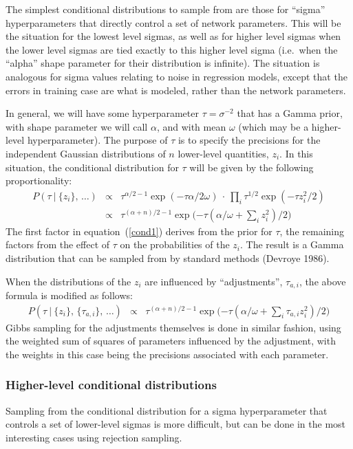 \documentclass{report}[11pt]
\def\beq{\begin{eqnarray}}
\def\eeq{\end{eqnarray}}
\begin{document}
The simplest conditional distributions to sample from are those for 
``sigma'' hyperparameters that directly control a set of network
parameters.  This will be the situation for the lowest level
sigmas, as well as for higher level sigmas when the lower level sigmas
are tied exactly to this higher level sigma (i.e.\ when the ``alpha''
shape parameter for their distribution is infinite).  The situation is
analogous for sigma values relating to noise in regression models,
except that the errors in training case are what is modeled, rather
than the network parameters.

In general, we will have some hyperparameter $\tau=\sigma^{-2}$ that
has a Gamma prior, with shape parameter we will call $\alpha$, and
with mean $\omega$ (which may be a higher-level hyperparameter).  The
purpose of $\tau$ is to specify the precisions for the independent
Gaussian distributions of $n$ lower-level quantities, $z_i$.  In this
situation, the conditional distribution for $\tau$ will be given by the
following proportionality:\beq
  P(\tau\ |\ \{z_i\},\,\ldots) & \propto &
    \tau^{\alpha/2-1} \exp(-\tau\alpha/2\omega) \ \cdot\ 
    \prod_i \tau^{1/2} \exp(-\tau z_i^2/2) \label{cond1}\\[3pt]
  & \propto &
    \tau^{(\alpha+n)/2-1} 
    \exp\big({\textstyle-\tau(\alpha/\omega+\sum\limits_i z_i^2)/2}\big)
\eeq%
The first factor in equation~(\ref{cond1}) derives from the prior for $\tau$, 
the remaining factors from the effect of $\tau$ on the probabilities of the 
$z_i$.  The result is a Gamma distribution that can be sampled from by 
standard methods (Devroye 1986).

When the distributions of the $z_i$ are influenced by ``adjustments'',
$\tau_{a,i}$, the above formula is modified as follows:\beq
  P(\tau\ |\ \{z_i\},\,\{\tau_{a,i}\},\,\ldots) 
  & \propto &
    \tau^{(\alpha+n)/2-1} 
    \exp\big({\textstyle-\tau(\alpha/\omega+\sum\limits_i \tau_{a,i}z_i^2)/2}
    \big)
\eeq%
Gibbs sampling for the adjustments themselves is done in similar fashion,
using the weighted sum of squares of parameters influenced by the adjustment,
with the weights in this case being the precisions associated with each 
parameter.


\subsubsection*{Higher-level conditional distributions}

Sampling from the conditional distribution for a sigma hyperparameter
that controls a set of lower-level sigmas is more difficult, but can
be done in the most interesting cases using rejection sampling.
\end{document}
